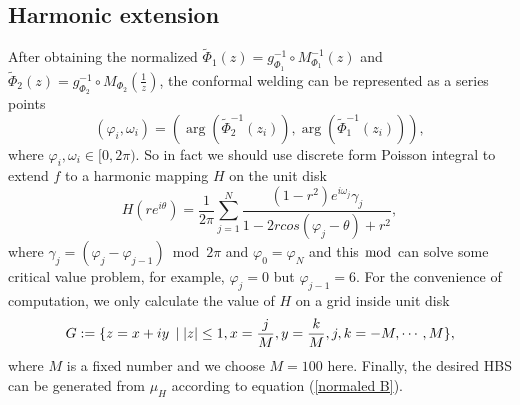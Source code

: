 \documentclass[review,onefignum,onetabnum]{siamonline190516}
\begin{document}
    \subsection{Harmonic extension}\label{detail harmonic}
        After obtaining the normalized $\tilde{\Phi}_1(z) = g_{\Phi_1}^{-1} \circ M_{\Phi_1}^{-1}(z)$ and $\tilde{\Phi}_2(z) = g_{\Phi_2}^{-1} \circ M_{\Phi_2} (\frac{1}{z})$, the conformal welding can be represented as a series points 
        \begin{equation*}
            (\varphi_i, \omega_i) = \left(\arg(\tilde{\Phi}_2^{-1}(z_i)), \arg(\tilde{\Phi}_1^{-1}(z_i))\right),
        \end{equation*}
        where $\varphi_i, \omega_i \in [0, 2\pi)$. So in fact we should use discrete form Poisson integral to extend $f$ to a harmonic mapping $H$ on the unit disk
        \begin{equation}\label{discrete poisson integral}
            H(re^{i\theta}) = \frac{1}{2\pi} \sum_{j=1}^N \frac{(1-r^2) e^{i \omega_j} \gamma_j}{1 - 2 r cos (\varphi_j - \theta) + r^2} ,
        \end{equation}
        where $\gamma_j = (\varphi_{j} - \varphi_{j-1}) \bmod{ 2\pi}$ and $\varphi_0 = \varphi_N$ and this $\bmod$ can solve some critical value problem, for example, $\varphi_j = 0$ but $\varphi_{j-1} = 6$. For the convenience of computation, we only calculate the value of $H$ on a grid inside unit disk
        \begin{equation}\label{grid G}
            G := \{z=x+i y \, \mid \abs{z} \le 1, x=\frac{j}{M}, y=\frac{k}{M}, j,k=-M,\cdots,M \},
        \end{equation}
        where $M$ is a fixed number and we choose $M=100$ here. Finally, the desired HBS can be generated from $\mu_H$ according to equation (\ref{normaled B}).
    
\end{document}
